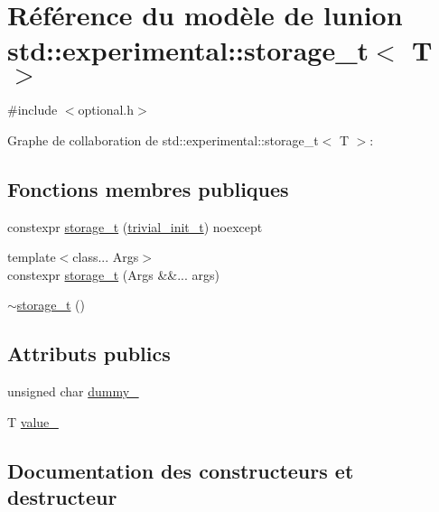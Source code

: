 \hypertarget{unionstd_1_1experimental_1_1storage__t}{}\section{Référence du modèle de l\textquotesingle{}union std\+:\+:experimental\+:\+:storage\+\_\+t$<$ T $>$}
\label{unionstd_1_1experimental_1_1storage__t}


{\ttfamily \#include $<$optional.\+h$>$}



Graphe de collaboration de std\+:\+:experimental\+:\+:storage\+\_\+t$<$ T $>$\+:
\subsection*{Fonctions membres publiques}
\begin{DoxyCompactItemize}
\item 
constexpr \hyperlink{unionstd_1_1experimental_1_1storage__t_a66bf7a342f8770f3213d17b2a4b3b33c}{storage\+\_\+t} (\hyperlink{structstd_1_1experimental_1_1trivial__init__t}{trivial\+\_\+init\+\_\+t}) noexcept
\item 
{\footnotesize template$<$class... Args$>$ }\\constexpr \hyperlink{unionstd_1_1experimental_1_1storage__t_ae93191c4a215b166fe38fbafabd26449}{storage\+\_\+t} (Args \&\&... args)
\item 
\hyperlink{unionstd_1_1experimental_1_1storage__t_a9de04c8f12a996c2b9b55d430713b31e}{$\sim$storage\+\_\+t} ()
\end{DoxyCompactItemize}
\subsection*{Attributs publics}
\begin{DoxyCompactItemize}
\item 
unsigned char \hyperlink{unionstd_1_1experimental_1_1storage__t_a66c46e8a91805a1495127fa280a3f58a}{dummy\+\_\+}
\item 
T \hyperlink{unionstd_1_1experimental_1_1storage__t_afc411a630487df07bf6278ebbef1ebb7}{value\+\_\+}
\end{DoxyCompactItemize}


\subsection{Documentation des constructeurs et destructeur}
\mbox{\label{unionstd_1_1experimental_1_1storage__t_a66bf7a342f8770f3213d17b2a4b3b33c}} 
